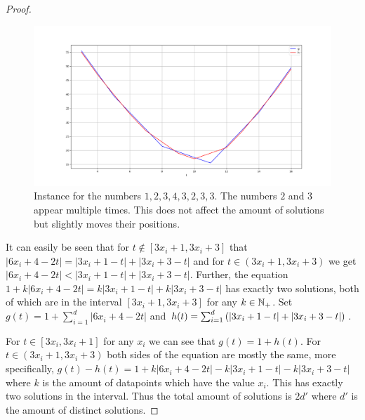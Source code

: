 \begin{proof}
	\begin{figure}
	  \centering
	  \includegraphics[scale=1, width=0.9\linewidth]{figures/manhattan-eq-red-2.png}
	  \caption{Instance for the numbers \(1,2,3,4,3,2,3,3\). The numbers \(2\) and \(3\) appear multiple times. This does not affect the amount of solutions but slightly moves their positions.}
	  \label{fig:manhattan-eq-red-2}
	\end{figure}

	It can easily be seen that for \(t \notin [3x_i + 1, 3x_i + 3]\) that \(|6x_i + 4 - 2t| = |3x_i + 1 - t| + |3x_i + 3 - t|\) and for \(t \in (3x_i + 1, 3x_i + 3)\) we get \(|6x_i + 4 - 2t| < |3x_i + 1 - t| + |3x_i + 3 - t|\). Further, the equation \(1 + k|6x_i + 4 - 2t| = k|3x_i + 1 - t| + k|3x_i + 3 - t|\) has exactly two solutions, both of which are in the interval \([3x_i+1,3x_i+3]\) for any \(k \in \mathbb{N}_+\). Set \(g(t) = 1 + \sum_{i=1}^d |6x_i + 4 - 2t|\) and \(h(t) = \sum_{i=1}^d \left(|3x_i + 1 - t| + |3x_i + 3 - t|\right)\).

	For \(t \in [3x_i, 3x_i + 1]\) for any \(x_i\) we can see that \(g(t) = 1 + h(t)\). For \(t \in (3x_i+1, 3x_i + 3)\) both sides of the equation are mostly the same, more specifically, \(g(t)- h(t) = 1 + k|6x_i + 4 - 2t| - k|3x_i + 1 - t| - k|3x_i + 3 - t|\) where \(k\) is the amount of datapoints which have the value \(x_i\). This has exactly two solutions in the interval. Thus the total amount of solutions is \(2d'\) where \(d'\) is the amount of distinct solutions.
\end{proof}



